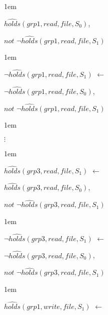 \documentclass[glov2,twocolumn,final]{svjour2}
\newenvironment{vquote}
  {\begin{list}{}{\leftmargin 1em}\item[]}
  {\end{list}}
\begin{document}
\begin{enumerate}
\begin{vquote}
           \hspace{1em}
           $\hat{holds}(grp1, read, file, S_{0})$,

           \hspace{1em}
           $not$ $\lnot\hat{holds}(grp1, read, file, S_{1})$
         \end{vquote}

         \begin{vquote}
           $\lnot\hat{holds}(grp1, read, file, S_{1})$ $\leftarrow$

           \hspace{1em}
           $\lnot\hat{holds}(grp1, read, file, S_{0})$,

           \hspace{1em}
           $not$ $\lnot\hat{holds}(grp1, read, file, S_{1})$
         \end{vquote}

         \begin{vquote}
           \hspace{2em}$\vdots$
         \end{vquote}

         \begin{vquote}
           $\hat{holds}(grp3, read, file, S_{1})$ $\leftarrow$

           \hspace{1em}
           $\hat{holds}(grp3, read, file, S_{0})$,

           \hspace{1em}
           $not$ $\lnot\hat{holds}(grp3, read, file, S_{1})$
         \end{vquote}

         \begin{vquote}
           $\lnot\hat{holds}(grp3, read, file, S_{1})$ $\leftarrow$

           \hspace{1em}
           $\lnot\hat{holds}(grp3, read, file, S_{0})$,

           \hspace{1em}
           $not$ $\lnot\hat{holds}(grp3, read, file, S_{1})$
         \end{vquote}

         \begin{vquote}
           $\hat{holds}(grp1, write, file, S_{1})$ $\leftarrow$


\end{vquote}
\end{enumerate}
\end{document}
